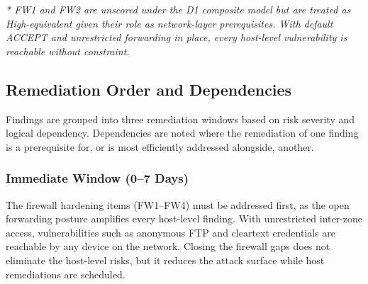 \documentclass[12pt]{article}
\begin{document}
\smallskip
\textit{* FW1 and FW2 are unscored under the D1 composite model but are treated
as High-equivalent given their role as network-layer prerequisites. With default
ACCEPT and unrestricted forwarding in place, every host-level vulnerability is
reachable without constraint.}
 
\subsection{Remediation Order and Dependencies}
 
Findings are grouped into three remediation windows based on risk severity and
logical dependency. Dependencies are noted where the remediation of one finding
is a prerequisite for, or is most efficiently addressed alongside, another.
 
\subsubsection*{Immediate Window (0--7 Days)}
 
The firewall hardening items (FW1--FW4) must be addressed first, as the open
forwarding posture amplifies every host-level finding. With unrestricted
inter-zone access, vulnerabilities such as anonymous FTP and cleartext
credentials are reachable by any device on the network. Closing the firewall
gaps does not eliminate the host-level risks, but it reduces the attack surface
while host remediations are scheduled.
 
\end{document}
